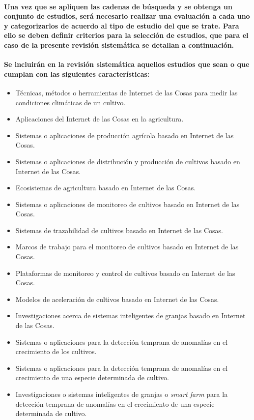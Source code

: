 \documentclass[10pt, twocolumn]{article}
\begin{document}
\paragraph{Una vez que se apliquen las cadenas de búsqueda y se obtenga un conjunto de estudios, será necesario realizar una evaluación a cada uno y categorizarlos de acuerdo al tipo de estudio del que se trate. Para ello se deben definir criterios para la selección de estudios, que para el caso de la presente revisión sistemática se detallan a continuación.}
\paragraph{Se incluirán en la revisión sistemática aquellos estudios que sean o que cumplan con las siguientes características:}
\begin{itemize}
	\item{Técnicas, métodos o herramientas de Internet de las Cosas para medir las condiciones climáticas de un cultivo.}
	\item{Aplicaciones del Internet de las Cosas en la agricultura.}
	\item{Sistemas o aplicaciones de producción agrícola basado en Internet de las Cosas.}
	\item{Sistemas o aplicaciones de distribución y producción de cultivos basado en Internet de las Cosas.}
	\item{Ecosistemas de agricultura basado en Internet de las Cosas.}
	\item{Sistemas o aplicaciones de monitoreo de cultivos basado en Internet de las Cosas.}
	\item{Sistemas de trazabilidad de cultivos basado en Internet de las Cosas.}
	\item{Marcos de trabajo para el monitoreo de cultivos basado en Internet de las Cosas.}
	\item{Plataformas de monitoreo y control de cultivos basado en Internet de las Cosas.}
	\item{Modelos de aceleración de cultivos basado en Internet de las Cosas.}	
	\item{Investigaciones acerca de sistemas inteligentes de granjas basado en Internet de las Cosas.}
	\item{Sistemas o aplicaciones para la detección temprana de anomalías en el crecimiento de los cultivos.}
	\item{Sistemas o aplicaciones para la detección temprana de anomalías en el crecimiento de una especie determinada de cultivo.}
	\item{Investigaciones o sistemas inteligentes de granjas o \textit{smart farm} para la detección temprana de anomalías en el crecimiento de una especie determinada de cultivo.}
\end{itemize}
\end{document}
